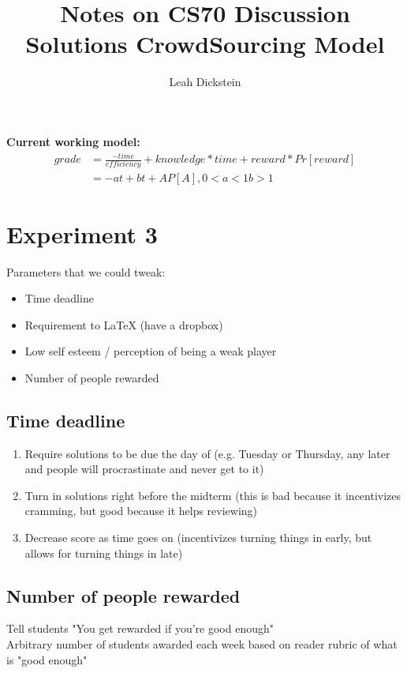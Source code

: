 \documentclass[leqno]{article}
\begin{document}
\title{Notes on CS70 Discussion Solutions CrowdSourcing Model}
\author{Leah Dickstein}

\maketitle

\textbf{Current working model:} 
\begin{align*}
grade &= \frac{-time}{efficiency} + knowledge*time + reward * Pr[reward]\\
&= -at + bt + AP[A], 0<a<1 b>1
\end{align*}

\tableofcontents

\section{Experiment 3}
Parameters that we could tweak:
\begin{itemize}
\item Time deadline
\item Requirement to LaTeX (have a dropbox)
\item Low self esteem / perception of being a weak player
\item Number of people rewarded
\end{itemize}

\subsection{Time deadline}
\begin{enumerate}
\item Require solutions to be due the day of (e.g. Tuesday or Thursday, any later and people will procrastinate and never get to it)
\item Turn in solutions right before the midterm (this is bad because it incentivizes cramming, but good because it helps reviewing)
\item Decrease score as time goes on (incentivizes turning things in early, but allows for turning things in late)
\end{enumerate}

\subsection{Number of people rewarded}
Tell students "You get rewarded if you're good enough"\\
Arbitrary number of students awarded each week based on reader rubric of what is "good enough"
\end{document}
